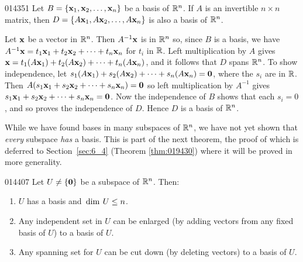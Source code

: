 \begin{example}{}{014351}
Let $B = \{\textbf{x}_{1}, \textbf{x}_{2}, \dots, \textbf{x}_{n}\}$ be a basis of $\mathbb{R}^n$. If $A$ is an invertible $n \times n$ matrix, then $D = \{A\textbf{x}_{1}, A\textbf{x}_{2}, \dots, A\textbf{x}_{n}\}$ is also a basis of $\mathbb{R}^n$.

\begin{solution}
Let $\textbf{x}$ be a vector in $\mathbb{R}^n$. Then $A^{-1}\textbf{x}$ is in $\mathbb{R}^n$ so, since $B$ is a basis, we have $A^{-1}\textbf{x} = t_{1}\textbf{x}_{1} + t_{2}\textbf{x}_{2} + \dots + t_{n}\textbf{x}_{n}$ for $t_{i}$ in $\mathbb{R}$. Left multiplication by $A$ gives $\textbf{x} = t_{1}(A\textbf{x}_{1}) + t_{2}(A\textbf{x}_{2}) + \dots + t_{n}(A\textbf{x}_{n})$, and it follows that $D$ spans $\mathbb{R}^n$. To show independence, let $s_{1}(A\textbf{x}_{1}) + s_{2}(A\textbf{x}_{2}) + \dots + s_{n}(A\textbf{x}_{n}) = \textbf{0}$, where the $s_{i}$ are in $\mathbb{R}$. Then $A(s_{1}\textbf{x}_{1} + s_{2}\textbf{x}_{2} + \dots + s_{n}\textbf{x}_{n}) = \textbf{0}$ so left multiplication by $A^{-1}$ gives $s_{1}\textbf{x}_{1} + s_{2}\textbf{x}_{2} + \dots + s_{n}\textbf{x}_{n} = \textbf{0}$. Now the independence of $B$ shows that each $s_{i} = 0$, and so proves the independence of $D$. Hence $D$ is a basis of $\mathbb{R}^n$.
\end{solution}
\end{example}

While we have found bases in many subspaces of $\mathbb{R}^n$, we have not yet shown that \textit{every} subspace \textit{has} a basis. This is part of the next theorem, the proof of which is deferred to Section~\ref{sec:6_4} (Theorem \ref{thm:019430}) where it will be proved in more generality.

\begin{theorem}{}{014407} %
Let $U \neq \{\normalfont{\textbf{0}}\}$ be a subspace of $\mathbb{R}^n$. Then:

\begin{enumerate}
\item $U$ has a basis and $\thinspace\operatorname{dim\medspace} U \leq n$.

\item Any independent set in $U$ can be enlarged (by adding vectors from any fixed basis of $U$) to a basis of $U$.

\item Any spanning set for $U$ can be cut down (by deleting vectors) to a basis of $U$.

\end{enumerate}
\end{theorem}

